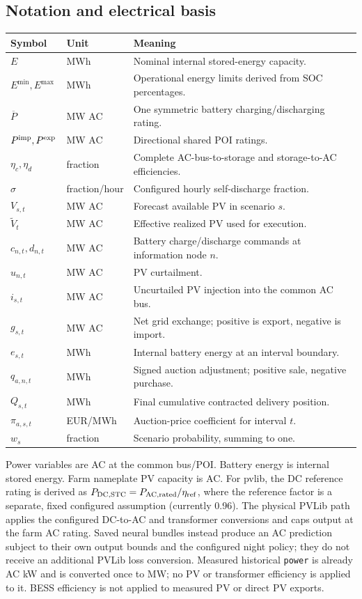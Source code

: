 \documentclass[11pt,a4paper]{article}
\begin{document}
\subsection{Notation and electrical basis}
\begin{longtable}{p{}p{}p{}}
\toprule Symbol & Unit & Meaning \\
\midrule\endhead
$E$ & MWh & Nominal internal stored-energy capacity.\\
$E^{\min},E^{\max}$ & MWh & Operational energy limits derived from SOC percentages.\\
$\overline P$ & MW AC & One symmetric battery charging/discharging rating.\\
$P^{\rm imp},P^{\rm exp}$ & MW AC & Directional shared POI ratings.\\
$\eta_c,\eta_d$ & fraction & Complete AC-bus-to-storage and storage-to-AC efficiencies.\\
$\sigma$ & fraction/hour & Configured hourly self-discharge fraction.\\
$V_{s,t}$ & MW AC & Forecast available PV in scenario $s$.\\
$\widetilde V_t$ & MW AC & Effective realized PV used for execution.\\
$c_{n,t},d_{n,t}$ & MW AC & Battery charge/discharge commands at information node $n$.\\
$u_{n,t}$ & MW AC & PV curtailment.\\
$i_{s,t}$ & MW AC & Uncurtailed PV injection into the common AC bus.\\
$g_{s,t}$ & MW AC & Net grid exchange; positive is export, negative is import.\\
$e_{s,t}$ & MWh & Internal battery energy at an interval boundary.\\
$q_{a,n,t}$ & MWh & Signed auction adjustment; positive sale, negative purchase.\\
$Q_{s,t}$ & MWh & Final cumulative contracted delivery position.\\
$\pi_{a,s,t}$ & EUR/MWh & Auction-price coefficient for interval $t$.\\
$w_s$ & fraction & Scenario probability, summing to one.\\
\bottomrule
\end{longtable}

Power variables are AC at the common bus/POI. Battery energy is internal stored
energy. Farm nameplate PV capacity is AC. For pvlib, the DC reference rating is
derived as $P_{\rm DC,STC}=P_{\rm AC,rated}/\eta_{\rm ref}$, where the reference
factor is a separate, fixed configured assumption (currently 0.96).
The physical PVLib path applies the configured DC-to-AC and transformer
conversions and caps output at the farm AC rating. Saved neural bundles instead
produce an AC prediction subject to their own output bounds and the configured
night policy; they do not receive an additional PVLib loss conversion.
Measured historical \texttt{power} is already AC kW and is converted once to MW;
no PV or transformer efficiency is applied to it. BESS efficiency is not applied to
measured PV or direct PV exports.
\end{document}
